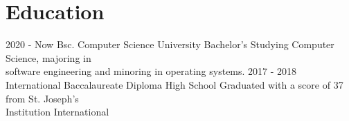 \documentclass[]{jvcv}
\begin{document}
%
\vspace{0.5cm}
\section{Education}

\begin{edulist}
	\eduentry
		{2020 - Now}
		{Bsc. Computer Science}
		{University Bachelor's}
		{Studying Computer Science, majoring in\\
		software engineering and minoring in operating systems.}
	\eduentry
		{2017 - 2018}
		{International Baccalaureate Diploma}
		{High School}
		{Graduated with a score of 37 from St. Joseph's\\
		Institution International}
\end{edulist}
\end{document}
